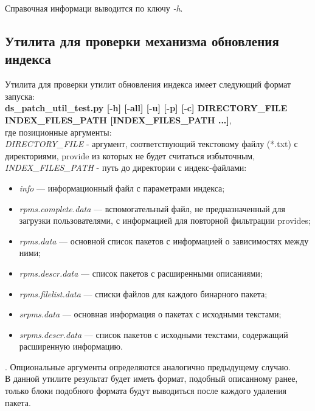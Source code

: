 Справочная информаци выводится по ключу \emph{-h}.\\

\subsection{Утилита для проверки механизма обновления индекса}
Утилита для проверки утилит обновления индекса имеет следующий формат запуска:\\
\textbf{ds\_patch\_util\_test.py [-h] [-all] [-u] [-p] [-c] DIRECTORY\_FILE INDEX\_FILES\_PATH [INDEX\_FILES\_PATH ...]},\\
 где
позиционные аргументы:\\
\emph{DIRECTORY\_FILE} - аргумент, соответствующий текстовому файлу (*.txt) с 
директориями, provide из которых не будет считаться избыточным,\\
\emph{INDEX\_FILES\_PATH} - путь до директории с индекс-файлами: \\
\begin{itemize}
\item{\textit{info} --- информационный файл с параметрами индекса;} 
\item{\textit{rpms.complete.data} --- вспомогательный файл, не предназначенный
для загрузки пользователями, с информацией для повторной фильтрации
provides;}
\item{\textit{rpms.data} --- основной список пакетов с информацией о зависимостях между ними;}
\item{\textit{rpms.descr.data} --- список пакетов с расширенными описаниями;}
\item{\textit{rpms.filelist.data} --- списки файлов для каждого бинарного пакета;}
\item{\textit{srpms.data} --- основная информация о пакетах с исходными текстами;}
\item{\textit{srpms.descr.data} --- список пакетов с исходными текстами, содержащий
расширенную информацию.}
\end{itemize}.
Опциональные аргументы определяются аналогично предыдущему случаю. \\
В данной утилите результат будет иметь  формат, подобный описанному ранее, 
только блоки подобного формата будут выводиться после каждого удаления пакета.


